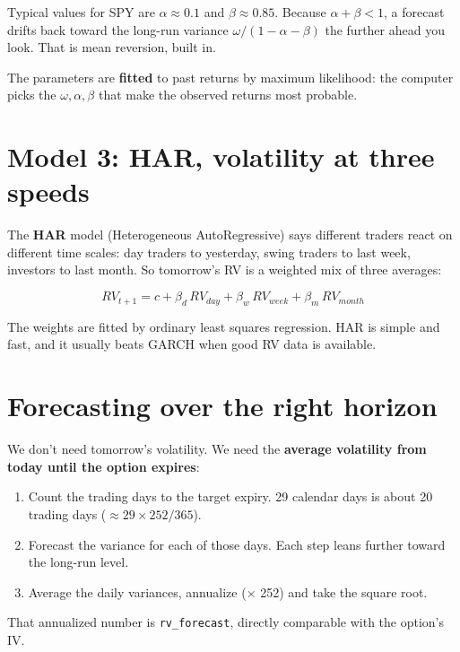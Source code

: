 \documentclass{article}
\begin{document}
Typical values for SPY are $\alpha \approx 0.1$ and $\beta \approx 0.85$. Because $\alpha + \beta < 1$, a forecast drifts back toward the long-run variance $\omega / (1 - \alpha - \beta)$ the further ahead you look. That is mean reversion, built in.

The parameters are \textbf{fitted} to past returns by maximum likelihood: the computer picks the $\omega, \alpha, \beta$ that make the observed returns most probable.

\section{Model 3: HAR, volatility at three speeds}

The \textbf{HAR} model (Heterogeneous AutoRegressive) says different traders react on different time scales: day traders to yesterday, swing traders to last week, investors to last month. So tomorrow's RV is a weighted mix of three averages:

\[RV_{t+1} = c + \beta_d\, RV_{day} + \beta_w\, RV_{week} + \beta_m\, RV_{month}\]

The weights are fitted by ordinary least squares regression. HAR is simple and fast, and it usually beats GARCH when good RV data is available.

\section{Forecasting over the right horizon}

We don't need tomorrow's volatility. We need the \textbf{average volatility from today until the option expires}:

\begin{enumerate}

\item Count the trading days to the target expiry. 29 calendar days is about 20 trading days ($\approx 29 \times 252/365$).

\item Forecast the variance for each of those days. Each step leans further toward the long-run level.

\item Average the daily variances, annualize (\ensuremath{\times} 252) and take the square root.

\end{enumerate}

That annualized number is \texttt{rv\_\allowbreak{}forecast}, directly comparable with the option's IV.
\end{document}
